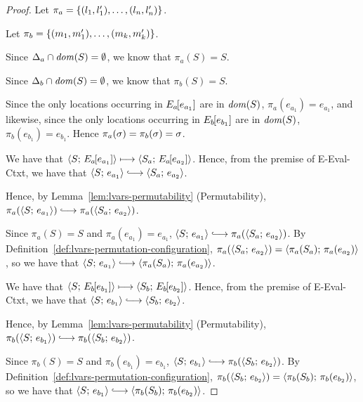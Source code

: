 \begin{proof}
  Let $\pi_a = \left\{(l_1, l'_1), \dots, (l_n, l'_n)\right\}$.

  Let $\pi_b = \left\{(m_1, m'_1), \dots, (m_k, m'_k)\right\}$.

  Since $\Delta_a \cap \mathit{dom}(S) = \emptyset$, we know that $\pi_a(S) = S$.

  Since $\Delta_b \cap \mathit{dom}(S) = \emptyset$, we know that $\pi_b(S) = S$.

  Since the only locations occurring in $E_a\hspace{-1mm}\left[e_{a_1}\right]$ are
  in $\mathit{dom}(S)$, $\pi_a(e_{a_1}) = e_{a_1}$, and likewise, since the
  only locations occurring in $E_b\hspace{-1mm}\left[e_{b_1}\right]$ are in
  $\mathit{dom}(S)$, $\pi_b(e_{b_1}) = e_{b_1}$. Hence $\pi_a(\sigma) =
  \pi_b(\sigma) = \sigma$.


  We have that $\langle S;\, E_a\hspace{-1mm}\left[e_{a_1}\right] \rangle \longmapsto
  \langle S_a;\, E_a\hspace{-1mm}\left[e_{a_2}\right] \rangle$.  Hence, from the premise of
  {\sc E-Eval-Ctxt}, we have that $\config{S}{e_{a_1}}
  \parstepsto \config{S_a}{e_{a_2}}$.

  Hence, by Lemma~\ref{lem:lvars-permutability} (Permutability),
  $\pi_a(\config{S}{e_{a_1}}) \parstepsto
  \pi_a(\config{S_a}{e_{a_2}})$.

  Since $\pi_a(S) = S$ and $\pi_a(e_{a_1}) = e_{a_1}$,
  $\config{S}{e_{a_1}} \parstepsto \pi_a(\config{S_a}{e_{a_2}})$.  By
  Definition~\ref{def:lvars-permutation-configuration},
  $\pi_a(\langle S_a;\, e_{a_2} \rangle) =
  \langle \pi_a(S_a);\, \pi_a(e_{a_2}) \rangle$, so we have that
  $\config{S}{e_{a_1}} \parstepsto
  \config{\pi_a(S_a)}{\pi_a(e_{a_2})}$.

  We have that $\langle S;\, E_b\hspace{-1mm}\left[e_{b_1}\right] \rangle \longmapsto
  \langle S_b;\, E_b\hspace{-1mm}\left[e_{b_2}\right] \rangle$.  Hence, from the premise of
  {\sc E-Eval-Ctxt}, we have that $\config{S}{e_{b_1}}
  \parstepsto \config{S_b}{e_{b_2}}$.

  Hence, by Lemma~\ref{lem:lvars-permutability} (Permutability),
  $\pi_b(\config{S}{e_{b_1}}) \parstepsto
  \pi_b(\config{S_b}{e_{b_2}})$.

  Since $\pi_b(S) = S$ and $\pi_b(e_{b_1}) = e_{b_1}$,
  $\config{S}{e_{b_1}} \parstepsto \pi_b(\config{S_b}{e_{b_2}})$.  By
  Definition~\ref{def:lvars-permutation-configuration},
  $\pi_b(\langle S_b;\, e_{b_2} \rangle) =
  \langle \pi_b(S_b);\, \pi_b(e_{b_2}) \rangle$, so we have that
  $\config{S}{e_{b_1}} \parstepsto
  \config{\pi_b(S_b)}{\pi_b(e_{b_2})}$.



\end{proof}
